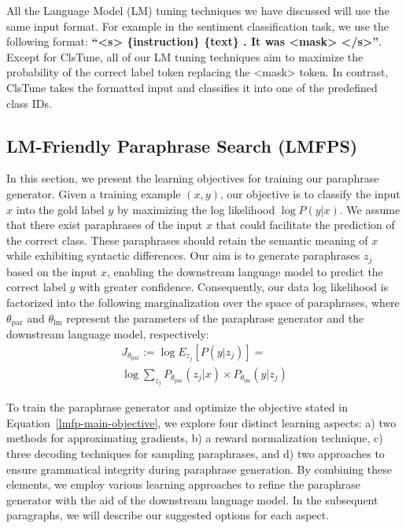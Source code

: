 \documentclass[11pt]{article}
\begin{document}
All the Language Model (LM) tuning techniques we have discussed will use the same input format. For example in the sentiment classification task, we use the following format:
\textbf{``<s> \{instruction\} \{text\} . It was <mask> </s>''}. Except for ClsTune, all of our LM tuning techniques aim to maximize the probability of the correct label token replacing the <mask> token. In contrast, ClsTune takes the formatted input and classifies it into one of the predefined class IDs.

\subsection{LM-Friendly Paraphrase Search (LMFPS)}
\label{paraphrase-objectives}
In this section, we present the learning objectives for training our paraphrase generator. Given a training example $(x, y)$, our objective is to classify the input $x$ into the gold label $y$ by maximizing the log likelihood $\log P(y|x)$. We assume that there exist paraphrases of the input $x$ that could facilitate the prediction of the correct class. These paraphrases should retain the semantic meaning of $x$ while exhibiting syntactic differences. Our aim is to generate paraphrases $z_{j}$ based on the input $x$, enabling the downstream language model to predict the correct label $y$ with greater confidence. Consequently, our data log likelihood is factorized into the following marginalization over the space of paraphrases, where $\theta_{\text{par}}$ and $\theta_{\text{lm}}$ represent the parameters of the paraphrase generator and the downstream language model, respectively:
\begin{multline}
J_{\theta_{\text{par}}} := \log E_{z_{j}} [P(y | z_{j})] = \\ \log \sum_{z_{j}} P_{\theta_{\text{par}}}(z_{j} | x) \times P_{\theta_{\text{lm}}}(y | z_{j})
\label{lmfp-main-objective}
\end{multline}


To train the paraphrase generator and optimize the objective stated in Equation~\ref{lmfp-main-objective}, we explore four distinct learning aspects: a) two methods for approximating gradients, b) a reward normalization technique, c) three decoding techniques for sampling paraphrases, and d) two approaches to ensure grammatical integrity during paraphrase generation. By combining these elements, we employ various learning approaches to refine the paraphrase generator with the aid of the downstream language model. In the subsequent paragraphs, we will describe our suggested options for each aspect.
\end{document}
